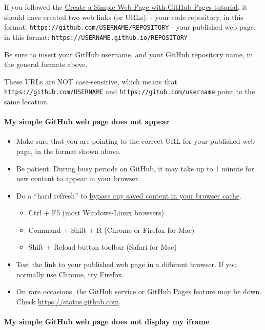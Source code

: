 \documentclass[
  english,
]{book}
\providecommand{\tightlist}{%
  \setlength{\itemsep}{0pt}\setlength{\parskip}{0pt}}
\begin{document}
If you followed the \href{github-pages}{Create a Simple Web Page with GitHub Pages tutorial}, it should have created two web links (or URLs):
- your code repository, in this format: \texttt{https://github.com/USERNAME/REPOSITORY}
- your published web page, in this format: \texttt{https://USERNAME.github.io/REPOSITORY}

Be sure to insert your GitHub username, and your GitHub repository name, in the general formats above.

These URLs are NOT case-sensitive, which means that \texttt{https://github.com/USERNAME} and \texttt{https://gitub.com/username} point to the same location.

\hypertarget{my-simple-github-web-page-does-not-appear}{%
\paragraph{My simple GitHub web page does not appear}\label{my-simple-github-web-page-does-not-appear}}

\begin{itemize}
\tightlist
\item
  Make sure that you are pointing to the correct URL for your published web page, in the format shown above.
\item
  Be patient. During busy periods on GitHub, it may take up to 1 minute for new content to appear in your browser.
\item
  Do a ``hard refresh'' to \href{https://en.wikipedia.org/wiki/Wikipedia:Bypass_your_cache}{bypass any saved content in your browser cache}.

  \begin{itemize}
  \tightlist
  \item
    Ctrl + F5 (most Windows-Linux browsers)
  \item
    Command + Shift + R (Chrome or Firefox for Mac)
  \item
    Shift + Reload button toolbar (Safari for Mac)
  \end{itemize}
\item
  Test the link to your published web page in a different browser. If you normally use Chrome, try Firefox.
\item
  On rare occasions, the GitHub service or GitHub Pages feature may be down. Check \url{https://status.github.com}.
\end{itemize}

\hypertarget{my-simple-github-web-page-does-not-display-my-iframe}{%
\paragraph{My simple GitHub web page does not display my iframe}\label{my-simple-github-web-page-does-not-display-my-iframe}}
\end{document}
